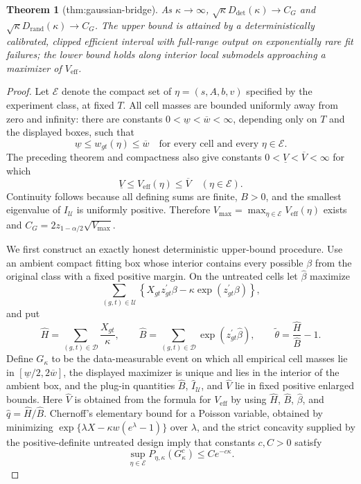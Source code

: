 \documentclass{article}
\newtheorem{theorem}{Theorem}
\begin{document}
\begin{theorem}[thm:gaussian-bridge]\label{thm:gaussian-bridge}
As \(\kappa\to\infty\), \(\sqrt\kappa D_{\mathrm{det}}(\kappa)\to C_G\) and \(\sqrt\kappa D_{\mathrm{rand}}(\kappa)\to C_G\). The upper bound is attained by a deterministically calibrated, clipped efficient interval with full-range output on exponentially rare fit failures; the lower bound holds along interior local submodels approaching a maximizer of \(V_{\mathrm{eff}}\).
\end{theorem}
\begin{proof}
Let \(\mathcal E\) denote the compact set of \(\eta=(s,A,b,v)\) specified
by the experiment class, at fixed \(T\).  All cell masses are bounded
uniformly away from zero and infinity: there are constants
\(0<\underline w<\overline w<\infty\), depending only on \(T\) and the
displayed boxes, such that
\[
 \underline w\leq w_{gt}(\eta)\leq\overline w
 \quad\text{for every cell and every }\eta\in\mathcal E.
\]
The preceding theorem and compactness also give constants
\(0<\underline V<\overline V<\infty\) for which
\[
 \underline V\leq V_{\mathrm{eff}}(\eta)\leq\overline V
 \quad (\eta\in\mathcal E).
\]
Continuity follows because all defining sums are finite, \(B>0\), and the
smallest eigenvalue of \(I_{\mathcal U}\) is uniformly positive.  Therefore
\(V_{\max}=\max_{\eta\in\mathcal E}V_{\mathrm{eff}}(\eta)\) exists and
\(C_G=2z_{1-\alpha/2}\sqrt{V_{\max}}\).

We first construct an exactly honest deterministic upper-bound procedure.
Use an ambient compact fitting box whose interior contains every possible
\(\beta\) from the original class with a fixed positive margin.  On the
untreated cells let \(\widehat\beta\) maximize
\[
 \sum_{(g,t)\in\mathcal U}
 \left\{X_{gt}z_{gt}^{\prime}\beta
             -\kappa\exp(z_{gt}^{\prime}\beta)\right\},
\]
and put
\[
 \widehat H=\sum_{(g,t)\in\mathcal D}\frac{X_{gt}}{\kappa},
 \qquad
 \widehat B=\sum_{(g,t)\in\mathcal D}
                   \exp(z_{gt}^{\prime}\widehat\beta),
 \qquad
 \widetilde\theta=\frac{\widehat H}{\widehat B}-1.
\]
Define \(G_\kappa\) to be the data-measurable event on which all empirical
cell masses lie in \([\underline w/2,2\overline w]\), the displayed
maximizer is unique and lies in the interior of the ambient box, and the
plug-in quantities \(\widehat B\), \(\widehat I_{\mathcal U}\), and
\(\widehat V\) lie in fixed positive enlarged bounds.  Here
\(\widehat V\) is obtained from the formula for \(V_{\mathrm{eff}}\) by
using \(\widehat H\), \(\widehat B\), \(\widehat\beta\), and
\(\widehat q=\widehat H/\widehat B\).  Chernoff's elementary bound for a
Poisson variable, obtained by minimizing
\(\exp\{\lambda X-\kappa w(e^\lambda-1)\}\) over \(\lambda\), and the
strict concavity supplied by the positive-definite untreated design imply
that constants \(c,C>0\) satisfy
\[
 \sup_{\eta\in\mathcal E}P_{\eta,\kappa}(G_\kappa^c)
 \leq Ce^{-c\kappa}.
\]


\end{proof}
\end{document}
